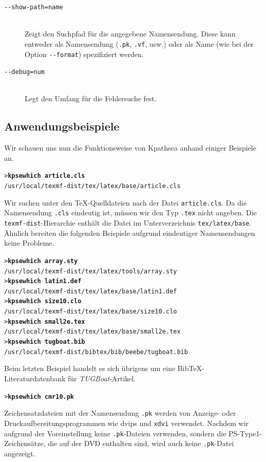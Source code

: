 \documentclass[12pt,ngerman,a4paper,fullparskip]{report}
\newcommand{\cmdname}[1]{\texttt{#1}}
\newcommand{\code}[1]{\texttt{#1}}
\newcommand{\file}[1]{\texttt{#1}}
\newcommand{\dirname}[1]{\texttt{#1}}
\newcommand{\KPS}{Kpathsea\xspace}
\newcommand{\var}[1]{\texttt{#1}}
\newcommand{\samp}[1]{\texttt{#1}}
\newcommand{\Ucom}[1]{\textbf{\texttt{#1}}}
\def\BibTeX{Bib\TeX}
\begin{document}
\begin{description}
\item[\texttt{-{}-show-path=}\var{name}]\mbox{}\\
     Zeigt den Suchpfad für die angegebene Namens\-endung. Diese kann entweder
     als Namens\-endung (\code{.pk}, \code{.vf}, usw.) oder als Name (wie bei der
     Option \code{-{}-format}) spezifiziert werden.
\item[\texttt{-{}-debug=}\var{num}]\mbox{}\\
     Legt den Umfang für die Fehlersuche fest.
\end{description}


\subsection{Anwendungsbeispiele}
\label{sec:examples-of-use}


Wir schauen uns nun die Funktionsweise von {\KPS} anhand einiger Beispiele an.

\begin{alltt}
> \Ucom{kpsewhich  article.cls}
   /usr/local/texmf-dist/tex/latex/base/article.cls
\end{alltt}

Wir suchen unter den \TeX-Quelldateien nach der Datei \file{article.cls}.
Da die Namens\-endung \samp{.cls} eindeutig ist, müssen wir den Typ
\samp{.tex} nicht angeben. Die \samp{texmf-dist}-Hierarchie enthält die
Datei im Unterverzeichnis \dirname{tex/latex/base}. Ähnlich bereiten
die folgenden Beispiele aufgrund eindeutiger Namens\-endungen keine Probleme.

\begin{alltt}
> \Ucom{kpsewhich array.sty}
   /usr/local/texmf-dist/tex/latex/tools/array.sty
> \Ucom{kpsewhich latin1.def}
   /usr/local/texmf-dist/tex/latex/base/latin1.def
> \Ucom{kpsewhich size10.clo}
   /usr/local/texmf-dist/tex/latex/base/size10.clo
> \Ucom{kpsewhich small2e.tex}
   /usr/local/texmf-dist/tex/latex/base/small2e.tex
> \Ucom{kpsewhich tugboat.bib}
   /usr/local/texmf-dist/bibtex/bib/beebe/tugboat.bib
\end{alltt}

Beim letzten Beispiel handelt es sich übrigens um eine \BibTeX-Literaturdatenbank für \textsl{TUGBoat}-Artikel.

\begin{alltt}
> \Ucom{kpsewhich cmr10.pk}
\end{alltt}

Zeichensatzdateien mit der Namens\-endung \samp{.pk} werden
von Anzeige- oder Druckaufbereitungsprogrammen wie dvips und
\cmdname{xdvi} verwendet. Nachdem wir aufgrund der Voreinstellung keine \file{.pk}-Dateien verwenden, sondern die PS-Type1-Zeichensätze, die auf der DVD enthalten sind, wird auch keine \file{.pk}-Datei angezeigt.
\end{document}
